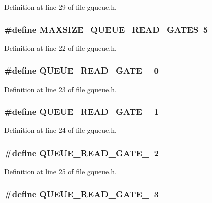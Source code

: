 Definition at line 29 of file gqueue.h.
\subsubsection[{MAXSIZE\_\-QUEUE\_\-READ\_\-GATES}]{\setlength{\rightskip}{0pt plus 5cm}\#define MAXSIZE\_\-QUEUE\_\-READ\_\-GATES~5}\label{gqueue_8h_ac3f84fecc52fe0f23ea7d5157cb92997}


Definition at line 22 of file gqueue.h.
\subsubsection[{QUEUE\_\-READ\_\-GATE\_\-0}]{\setlength{\rightskip}{0pt plus 5cm}\#define QUEUE\_\-READ\_\-GATE\_~0}\label{gqueue_8h_a8b86910c01a28f01838c038cc34672e1}


Definition at line 23 of file gqueue.h.
\subsubsection[{QUEUE\_\-READ\_\-GATE\_\-1}]{\setlength{\rightskip}{0pt plus 5cm}\#define QUEUE\_\-READ\_\-GATE\_~1}\label{gqueue_8h_aaaaea04d929e35142e01be4c56516370}


Definition at line 24 of file gqueue.h.
\subsubsection[{QUEUE\_\-READ\_\-GATE\_\-2}]{\setlength{\rightskip}{0pt plus 5cm}\#define QUEUE\_\-READ\_\-GATE\_~2}\label{gqueue_8h_abf70c568abf45a19626d44ae6ce335f1}


Definition at line 25 of file gqueue.h.
\subsubsection[{QUEUE\_\-READ\_\-GATE\_\-3}]{\setlength{\rightskip}{0pt plus 5cm}\#define QUEUE\_\-READ\_\-GATE\_~3}\label{gqueue_8h_a59e133f0d1912726949366d6b08cd3f5}


